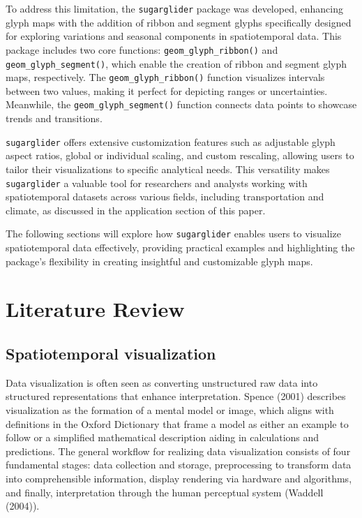 To address this limitation, the \texttt{sugarglider} package was developed, enhancing glyph maps with the addition of ribbon and segment glyphs specifically designed for exploring variations and seasonal components in spatiotemporal data. This package includes two core functions: \texttt{geom\_glyph\_ribbon()} and \texttt{geom\_glyph\_segment()}, which enable the creation of ribbon and segment glyph maps, respectively. The \texttt{geom\_glyph\_ribbon()} function visualizes intervals between two values, making it perfect for depicting ranges or uncertainties. Meanwhile, the \texttt{geom\_glyph\_segment()} function connects data points to showcase trends and transitions.

\texttt{sugarglider} offers extensive customization features such as adjustable glyph aspect ratios, global or individual scaling, and custom rescaling, allowing users to tailor their visualizations to specific analytical needs. This versatility makes \texttt{sugarglider} a valuable tool for researchers and analysts working with spatiotemporal datasets across various fields, including transportation and climate, as discussed in the application section of this paper.

The following sections will explore how \texttt{sugarglider} enables users to visualize spatiotemporal data effectively, providing practical examples and highlighting the package's flexibility in creating insightful and customizable glyph maps.

\hypertarget{literature-review}{%
\section{Literature Review}\label{literature-review}}

\hypertarget{spatiotemporal-visualization}{%
\subsection{Spatiotemporal visualization}\label{spatiotemporal-visualization}}

Data visualization is often seen as converting unstructured raw data into structured representations that enhance interpretation. Spence (2001) describes visualization as the formation of a mental model or image, which aligns with definitions in the Oxford Dictionary that frame a model as either an example to follow or a simplified mathematical description aiding in calculations and predictions. The general workflow for realizing data visualization consists of four fundamental stages: data collection and storage, preprocessing to transform data into comprehensible information, display rendering via hardware and algorithms, and finally, interpretation through the human perceptual system (Waddell (2004)).

